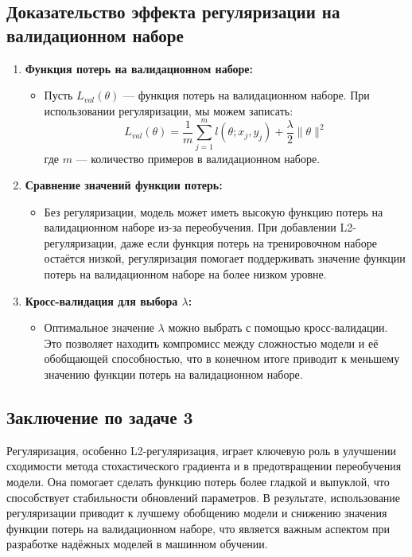 \subsection*{Доказательство эффекта регуляризации на валидационном наборе}
\begin{enumerate}
    \item \textbf{Функция потерь на валидационном наборе:}
    \begin{itemize}
        \item Пусть \( L_{val}(\theta) \) — функция потерь на валидационном наборе. При использовании регуляризации, мы можем записать:
        $$ L_{val}(\theta) = \frac{1}{m} \sum_{j=1}^{m} l(\theta; x_j, y_j) + \frac{\lambda}{2} \|\theta\|^2 $$
        где \( m \) — количество примеров в валидационном наборе.
    \end{itemize}

    \item \textbf{Сравнение значений функции потерь:}
    \begin{itemize}
        \item Без регуляризации, модель может иметь высокую функцию потерь на валидационном наборе из-за переобучения. При добавлении L2-регуляризации, даже если функция потерь на тренировочном наборе остаётся низкой, регуляризация помогает поддерживать значение функции потерь на валидационном наборе на более низком уровне.
    \end{itemize}

    \item \textbf{Кросс-валидация для выбора \( \lambda \):}
    \begin{itemize}
        \item Оптимальное значение \( \lambda \) можно выбрать с помощью кросс-валидации. Это позволяет находить компромисс между сложностью модели и её обобщающей способностью, что в конечном итоге приводит к меньшему значению функции потерь на валидационном наборе.
    \end{itemize}
\end{enumerate}

\subsection*{Заключение по задаче 3}
Регуляризация, особенно L2-регуляризация, играет ключевую роль в улучшении сходимости метода стохастического градиента и в предотвращении переобучения модели. Она помогает сделать функцию потерь более гладкой и выпуклой, что способствует стабильности обновлений параметров. В результате, использование регуляризации приводит к лучшему обобщению модели и снижению значения функции потерь на валидационном наборе, что является важным аспектом при разработке надёжных моделей в машинном обучении.

